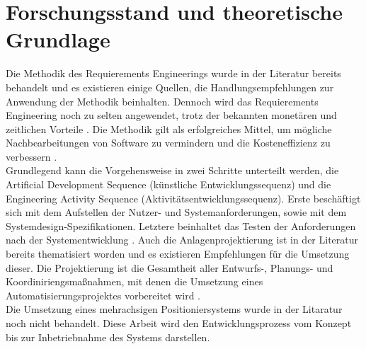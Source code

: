 \documentclass[12pt, a4paper, twoside]{article} %
\begin{document}
\section{Forschungsstand und theoretische Grundlage}
Die Methodik des Requierements Engineerings wurde in der Literatur bereits behandelt und es existieren einige Quellen, die Handlungsempfehlungen zur Anwendung der Methodik beinhalten. Dennoch wird das Requierements Engineering noch zu selten angewendet, trotz der bekannten monetären und zeitlichen Vorteile \cite[xvii]{Laplante2014}. Die Methodik gilt als erfolgreiches Mittel, um mögliche Nachbearbeitungen von Software zu vermindern und die Kosteneffizienz zu verbessern \cite[1]{
Laplante2014}.\\
Grundlegend kann die Vorgehensweise in zwei Schritte unterteilt werden, die \glqq Artificial Development Sequence\grqq{} (künstliche Entwicklungssequenz) und die \glqq Engineering Activity Sequence\grqq{} (Aktivitätsentwicklungssequenz). Erste beschäftigt sich mit dem Aufstellen der Nutzer- und Systemanforderungen, sowie mit dem Systemdesign-Spezifikationen. Letztere beinhaltet das Testen der Anforderungen nach der Systementwicklung \cite[6]{
Laplante2014}.
Auch die Anlagenprojektierung ist in der Literatur bereits thematisiert worden und es existieren Empfehlungen für die Umsetzung dieser. Die Projektierung ist die Gesamtheit aller Entwurfs-, Planungs- und Koordiniriengsmaßnahmen, mit denen die Umsetzung eines Automatisierungsprojektes vorbereitet wird \cite[8]{Bindel2017}.\\
Die Umsetzung eines mehrachsigen Positioniersystems wurde in der Litaratur noch nicht behandelt. Diese Arbeit wird den Entwicklungsprozess vom Konzept bis zur Inbetriebnahme des Systems darstellen. 
\end{document}
